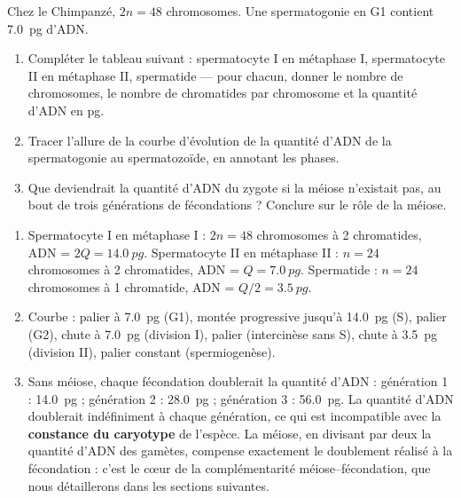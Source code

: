 \documentclass[11pt]{article}
\begin{document}
\begin{exercice}
Chez le Chimpanzé, $2n = 48$ chromosomes. Une spermatogonie en G1 contient \SI{7,0}{pg} d'ADN.
\begin{enumerate}
\item Compléter le tableau suivant : spermatocyte I en métaphase I, spermatocyte II en métaphase II, spermatide — pour chacun, donner le nombre de chromosomes, le nombre de chromatides par chromosome et la quantité d'ADN en pg.
\item Tracer l'allure de la courbe d'évolution de la quantité d'ADN de la spermatogonie au spermatozoïde, en annotant les phases.
\item Que deviendrait la quantité d'ADN du zygote si la méiose n'existait pas, au bout de trois générations de fécondations ? Conclure sur le rôle de la méiose.
\end{enumerate}
\end{exercice}

\begin{corrige}
\begin{enumerate}
\item Spermatocyte I en métaphase I : $2n = 48$ chromosomes à 2 chromatides, ADN = $2Q = \SI{14,0}{pg}$. Spermatocyte II en métaphase II : $n = 24$ chromosomes à 2 chromatides, ADN = $Q = \SI{7,0}{pg}$. Spermatide : $n = 24$ chromosomes à 1 chromatide, ADN = $Q/2 = \SI{3,5}{pg}$.
\item Courbe : palier à \SI{7,0}{pg} (G1), montée progressive jusqu'à \SI{14,0}{pg} (S), palier (G2), chute à \SI{7,0}{pg} (division I), palier (intercinèse sans S), chute à \SI{3,5}{pg} (division II), palier constant (spermiogenèse).
\item Sans méiose, chaque fécondation doublerait la quantité d'ADN : génération 1 : \SI{14,0}{pg} ; génération 2 : \SI{28,0}{pg} ; génération 3 : \SI{56,0}{pg}. La quantité d'ADN doublerait indéfiniment à chaque génération, ce qui est incompatible avec la \textbf{constance du caryotype} de l'espèce. La méiose, en divisant par deux la quantité d'ADN des gamètes, compense exactement le doublement réalisé à la fécondation : c'est le cœur de la complémentarité méiose--fécondation, que nous détaillerons dans les sections suivantes.
\end{enumerate}
\end{corrige}
\end{document}
